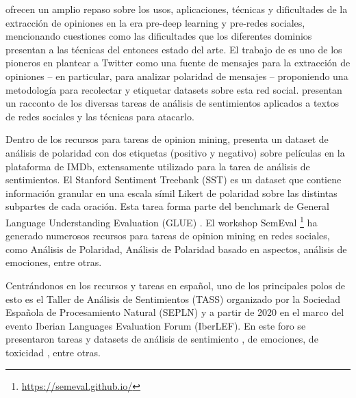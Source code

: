\citet{pang2008opinion} ofrecen un amplio repaso sobre los usos, aplicaciones, técnicas y dificultades de la extracción de opiniones en la era pre-deep learning y pre-redes sociales, mencionando cuestiones como las dificultades que los diferentes dominios presentan a las técnicas del entonces estado del arte. El trabajo de \citet{pak2010twitter} es uno de los pioneros en plantear a Twitter como una fuente de mensajes para la extracción de opiniones -- en particular, para analizar polaridad de mensajes -- proponiendo una metodología para recolectar y etiquetar datasets sobre esta red social. \citet{yue2019survey} presentan un racconto de los diversas tareas de análisis de sentimientos aplicados a textos de redes sociales y las técnicas para atacarlo.

Dentro de los recursos para tareas de opinion mining, \citet{maas-EtAl:2011:ACL-HLT2011} presenta un dataset de análisis de polaridad con dos etiquetas (positivo y negativo) sobre películas en la plataforma de IMDb, extensamente utilizado para la tarea de análisis de sentimientos. El Stanford Sentiment Treebank (SST) \cite{socher-etal-2013-recursive} es un dataset que contiene información granular en una escala símil Likert de polaridad sobre las distintas subpartes de cada oración. Esta tarea forma parte del benchmark de General Language Understanding Evaluation (GLUE) \cite{wang-etal-2018-glue}. El workshop SemEval \footnote{\url{https://semeval.github.io/}} ha generado numerosos recursos para tareas de opinion mining en redes sociales, como Análisis de Polaridad, Análisis de Polaridad basado en aspectos, análisis de emociones, entre otras.

Centrándonos en los recursos y tareas en español, uno de los principales polos de esto es el Taller de Análisis de Sentimientos (TASS) \cite{overview_tass2018,garcia2020overview,cumbreras2016overview} organizado por la Sociedad Española de Procesamiento Natural (SEPLN) y a partir de 2020 en el marco del evento Iberian Languages Evaluation Forum (IberLEF). En este foro se presentaron tareas y datasets de análisis de sentimiento \cite{garcia2020overview}, de emociones\cite{plaza-del-arco-etal-2020-emoevent}, de toxicidad \cite{taule2021detoxis}, entre otras.


